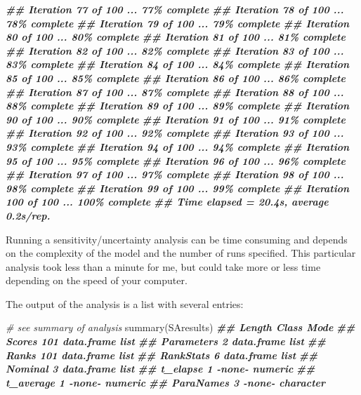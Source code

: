\documentclass[
]{book}
\newenvironment{Shaded}{\begin{snugshade}}{\end{snugshade}}
\newcommand{\CommentTok}[1]{\textcolor[rgb]{0.56,0.35,0.01}{\textit{#1}}}
\newcommand{\DocumentationTok}[1]{\textcolor[rgb]{0.56,0.35,0.01}{\textbf{\textit{#1}}}}
\newcommand{\FunctionTok}[1]{\textcolor[rgb]{0.00,0.00,0.00}{#1}}
\newcommand{\NormalTok}[1]{#1}
\begin{document}
\begin{Shaded}
\begin{Highlighting}[]
\DocumentationTok{\#\# Iteration 77 of 100 ... 77\% complete}
\DocumentationTok{\#\# Iteration 78 of 100 ... 78\% complete}
\DocumentationTok{\#\# Iteration 79 of 100 ... 79\% complete}
\DocumentationTok{\#\# Iteration 80 of 100 ... 80\% complete}
\DocumentationTok{\#\# Iteration 81 of 100 ... 81\% complete}
\DocumentationTok{\#\# Iteration 82 of 100 ... 82\% complete}
\DocumentationTok{\#\# Iteration 83 of 100 ... 83\% complete}
\DocumentationTok{\#\# Iteration 84 of 100 ... 84\% complete}
\DocumentationTok{\#\# Iteration 85 of 100 ... 85\% complete}
\DocumentationTok{\#\# Iteration 86 of 100 ... 86\% complete}
\DocumentationTok{\#\# Iteration 87 of 100 ... 87\% complete}
\DocumentationTok{\#\# Iteration 88 of 100 ... 88\% complete}
\DocumentationTok{\#\# Iteration 89 of 100 ... 89\% complete}
\DocumentationTok{\#\# Iteration 90 of 100 ... 90\% complete}
\DocumentationTok{\#\# Iteration 91 of 100 ... 91\% complete}
\DocumentationTok{\#\# Iteration 92 of 100 ... 92\% complete}
\DocumentationTok{\#\# Iteration 93 of 100 ... 93\% complete}
\DocumentationTok{\#\# Iteration 94 of 100 ... 94\% complete}
\DocumentationTok{\#\# Iteration 95 of 100 ... 95\% complete}
\DocumentationTok{\#\# Iteration 96 of 100 ... 96\% complete}
\DocumentationTok{\#\# Iteration 97 of 100 ... 97\% complete}
\DocumentationTok{\#\# Iteration 98 of 100 ... 98\% complete}
\DocumentationTok{\#\# Iteration 99 of 100 ... 99\% complete}
\DocumentationTok{\#\# Iteration 100 of 100 ... 100\% complete}
\DocumentationTok{\#\# Time elapsed = 20.4s, average 0.2s/rep.}
\end{Highlighting}
\end{Shaded}

Running a sensitivity/uncertainty analysis can be time consuming and depends on the complexity of the model and the number of runs specified. This particular analysis took less than a minute for me, but could take more or less time depending on the speed of your computer.

The output of the analysis is a list with several entries:

\begin{Shaded}
\begin{Highlighting}[]
\CommentTok{\# see summary of analysis}
\FunctionTok{summary}\NormalTok{(SAresults)}
\DocumentationTok{\#\#            Length Class      Mode     }
\DocumentationTok{\#\# Scores     101    data.frame list     }
\DocumentationTok{\#\# Parameters   2    data.frame list     }
\DocumentationTok{\#\# Ranks      101    data.frame list     }
\DocumentationTok{\#\# RankStats    6    data.frame list     }
\DocumentationTok{\#\# Nominal      3    data.frame list     }
\DocumentationTok{\#\# t\_elapse     1    {-}none{-}     numeric  }
\DocumentationTok{\#\# t\_average    1    {-}none{-}     numeric  }
\DocumentationTok{\#\# ParaNames    3    {-}none{-}     character}
\end{Highlighting}
\end{Shaded}
\end{document}
